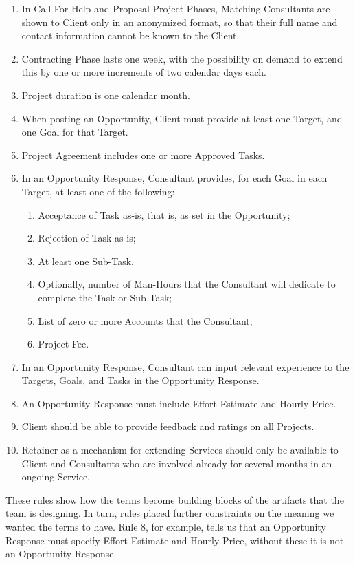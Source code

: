 \documentclass[graybox,envcountchap,sectrefs]{svmono}
\begin{document}
\begin{svgraybox}
\begin{enumerate}
\item In Call For Help and Proposal Project Phases, Matching Consultants are shown to Client only in an anonymized format, so that their full name and contact information cannot be known to the Client.
\item Contracting Phase lasts one week, with the possibility on demand to extend this by one or more increments of two calendar days each.
\item Project duration is one calendar month.
\item When posting an Opportunity, Client must provide at least one Target, and one Goal for that Target.
\item Project Agreement includes one or more Approved Tasks.
\item In an Opportunity Response, Consultant provides, for each Goal in each Target, at least one of the following:
	\begin{enumerate} 
		\item Acceptance of Task as-is, that is, as set in the Opportunity;
		\item Rejection of Task as-is;
		\item At least one Sub-Task.
		\item Optionally, number of Man-Hours that the Consultant will dedicate to complete the Task or Sub-Task;
		\item List of zero or more Accounts that the Consultant; 
		\item Project Fee.
	\end{enumerate}
\item In an Opportunity Response, Consultant can input relevant experience to the Targets, Goals, and Tasks in the Opportunity Response.
\item An Opportunity Response must include Effort Estimate and Hourly Price.
\item Client should be able to provide feedback and ratings on all Projects.
\item Retainer as a mechanism for extending Services should only be available to Client and Consultants who are involved already for several months in an ongoing Service.
\end{enumerate}
\end{svgraybox}

These rules show how the terms become building blocks of the artifacts that the team is designing. In turn, rules placed further constraints on the meaning we wanted the terms to have. Rule 8, for example, tells us that an Opportunity Response must specify Effort Estimate and Hourly Price, without these it is not an Opportunity Response. 
\end{document}
